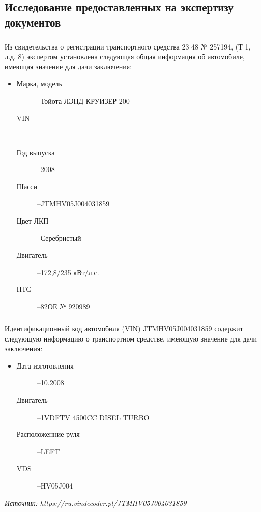 \subsection{Исследование предоставленных на экспертизу документов}
%
 \subparagraph*{}Из свидетельства о регистрации транспортного средства 23 48 № 257194,  (Т 1, л.д. 8)  экспертом установлена следующая общая информация об автомобиле, имеющая значение для дачи заключения:
	\begin{itemize}
		\item[ ] 
			\begin{description}
			\item[Марка, модель] --Тойота ЛЭНД КРУИЗЕР 200
			\item[VIN] -- \vin
			\item[Год выпуска] --2008
			\item[Шасси] --JTMHV05J004031859
			\item[Цвет ЛКП] --Серебристый
			\item[Двигатель] --172,8/235 кВт/л.с.
			\item[ПТС] --82ОЕ № 920989
%						
		\end{description}
		\end{itemize}
	\subparagraph*{} Идентификационный код автомобиля (VIN)  JTMHV05J004031859 содержит следующую информацию о транспортном средстве, имеющую значение для 	дачи заключения:
%
\begin{itemize}
	\item[ ] 
	    \begin{description}
%		
	\item[Дата изготовления] --10.2008
	\item[Двигатель] --1VDFTV  4500CC DISEL TURBO
	\item [Расположенние руля] --LEFT
	\item[VDS] --HV05J004
%	
		\end{description}
\end{itemize}
%
%
\textit{Источник: https://ru.vindecoder.pl/JTMHV05J004031859}

